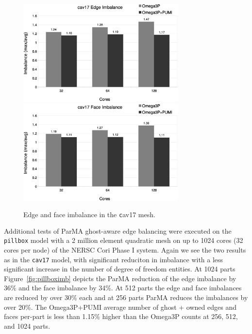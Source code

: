 \documentclass[review,12pt]{elsarticle_summary_report}
\begin{document}
\begin{figure}[!ph]
\centering
  \includegraphics[width=0.75\textwidth]{cav17-edge-imb.eps} \\
  \includegraphics[width=0.75\textwidth]{cav17-face-imb.eps} 
  \caption{\label{fig:cav17imb} Edge and face imbalance in the {\texttt cav17} mesh.}
\end{figure}

Additional tests of ParMA ghost-aware edge balancing were executed on the
\texttt{pillbox} model with a 2 million element quadratic mesh on up to 1024
cores (32 cores per node) of the NERSC Cori Phase I system.
Again we see the two results as in the \texttt{cav17} model, with significant reduciton in 
imbalance with a less significant increase in the number of degree of freedom entities.
At 1024 parts Figure~\ref{fig:pillboximb} depicts the ParMA reduction of the
edge imbalance by 36\% and the face imbalance by 34\%.
At 512 parts the edge and face imbalances are reduced by over 30\% each and
at 256 parts ParMA reduces the imbalances by over 20\%.
The Omega3P+PUMI average number of ghost + owned edges and faces per-part
is less than 1.15\% higher than the Omega3P counts at 256, 512, and 1024 parts.
\end{document}
